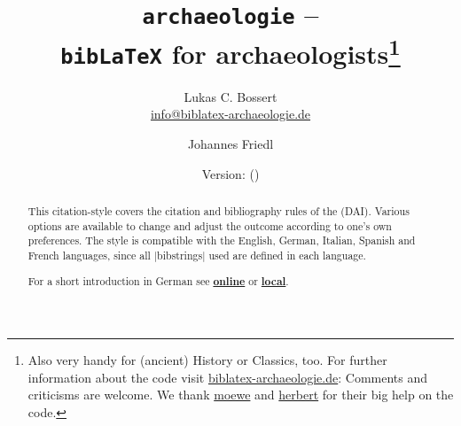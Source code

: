 \documentclass[a4paper,
10pt,
greek,
french,
spanish,
italian,
ngerman,
english
]{ltxdoc}
\begin{document}
\title{\texttt{archaeologie} -- \\\texttt{bib\LaTeX} for archaeologists\footnote{Also very handy for (ancient) History or Classics, too.
For further information about the code visit \href{http://www.biblatex-archaeologie.de}{biblatex-archaeologie.de}: 
Comments and criticisms are welcome.
We thank  \href{https://tex.stackexchange.com/users/35864/moewe}{moewe} and \href{https://tex.stackexchange.com/users/2478/herbert}{herbert} for their big help on the code.%
}}
\author{Lukas C. Bossert\\{\small \href{mailto:info@biblatex-archaeologie.de}{info@biblatex-archaeologie.de}} 
\and Johannes Friedl}
\date{Version: \archaeologieversion{} (\archaeologiedate)} 
\maketitle

\begin{abstract}
\noindent This citation-style covers the citation and bibliography rules of the \DAI (DAI). 
Various options are available to change and adjust the outcome according to one's own preferences. 
The style is compatible with the English, German, Italian, Spanish and French languages, since all |bibstrings| used are defined in each language.
\bigskip

\noindent For a short introduction in German see   \href{pdfdeu.biblatex-archaeologie.de}{\textbf{online}} or   \href{file:archaeologie-ger.pdf}{\textbf{local}}.
\end{abstract}


\begin{multicols}{2}
\footnotesize\parskip=0mm \tableofcontents
\end{multicols}
\end{document}
